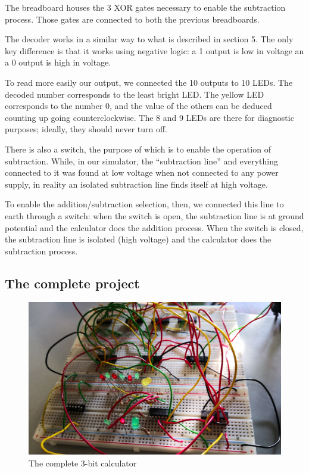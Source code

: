 \documentclass{article}
\begin{document}
The breadboard houses the 3 XOR gates necessary to enable the subtraction process. Those gates are connected to both the previous breadboards.

\vspace{5mm}

The decoder works in a similar way to what is described in section 5. The only key difference is that it works using negative logic: a 1 output is low in voltage an a 0 output is high in voltage. 

To read more easily our output, we connected the 10 outputs to 10 LEDs. The decoded number corresponds to the least bright LED. The yellow LED corresponds to the number 0, and the value of the others can be deduced counting up going counterclockwise. The 8 and 9 LEDs are there for diagnostic purposes; ideally, they should never turn off.

\vspace{5mm}

There is also a switch, the purpose of which is to enable the operation of subtraction. While, in our simulator, the ``subtraction line'' and everything connected to it was found at low voltage when not connected to any power supply, in reality an isolated subtraction line finds itself at high voltage. 

To enable the addition/subtraction selection, then, we connected this line to earth through a switch: when the switch is open, the subtraction line is at ground potential and the calculator does the addition process. When the switch is closed, the subtraction line is isolated (high voltage) and the calculator does the subtraction process.

\clearpage

\subsection{The complete project}

\begin{figure}[h]
  \centering
  \includegraphics[width=\linewidth]{calculator}
  \caption{The complete 3-bit calculator}
  \label{calculator}
\end{figure}
\end{document}
